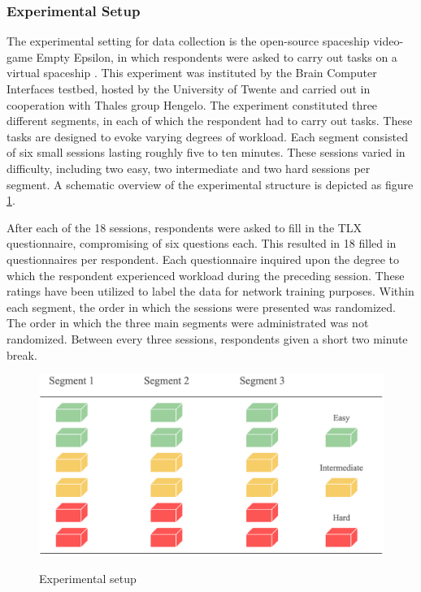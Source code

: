 \documentclass[12pt]{article}
\begin{document}
\subsubsection{Experimental Setup}
The experimental setting for data collection is the open-source spaceship video-game Empty Epsilon, in which respondents were asked to carry out tasks on a virtual spaceship \cite{daid2016empty}. This experiment was instituted by the Brain Computer Interfaces testbed, hosted by the University of Twente and carried out in cooperation with Thales group Hengelo. The experiment constituted three different segments, in each of which the respondent had to carry out tasks. These tasks are designed to evoke varying degrees of workload. Each segment consisted of six small sessions lasting roughly five to ten minutes. These sessions varied in difficulty, including two easy, two intermediate and two hard sessions per segment. A schematic overview of the experimental structure is depicted as figure \ref{fig:experimental}. 

After each of the 18 sessions, respondents were asked to fill in the TLX questionnaire, compromising of six questions each. This resulted in 18 filled in questionnaires per respondent. Each questionnaire inquired upon the degree to which the respondent experienced workload during the preceding session. These ratings have been utilized to label the data for network training purposes. Within each segment, the order in which the sessions were presented was randomized. The order in which the three main segments were administrated was not randomized. Between every three sessions, respondents given a short two minute break.

\begin{figure}
\caption{Experimental setup}
\bigskip
\includegraphics[scale=0.4]{experimental_setup}
\label{fig:experimental}
\end{figure}
\end{document}
